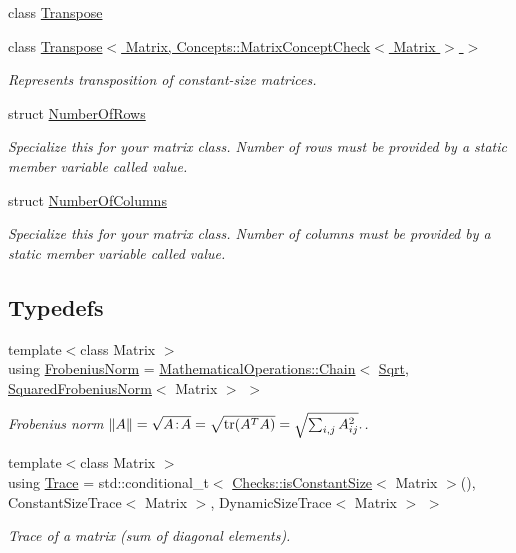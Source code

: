 \begin{DoxyCompactItemize}
class \hyperlink{classfuncy_1_1LinearAlgebra_1_1Transpose}{Transpose}
\item 
class \hyperlink{classfuncy_1_1LinearAlgebra_1_1Transpose_3_01Matrix_00_01Concepts_1_1MatrixConceptCheck_3_01Matrix_01_4_01_4}{Transpose$<$ Matrix, Concepts\-::\-Matrix\-Concept\-Check$<$ Matrix $>$ $>$}
\begin{DoxyCompactList}\small\item\em Represents transposition of constant-\/size matrices. \end{DoxyCompactList}\item 
struct \hyperlink{structfuncy_1_1LinearAlgebra_1_1NumberOfRows}{Number\-Of\-Rows}
\begin{DoxyCompactList}\small\item\em Specialize this for your matrix class. Number of rows must be provided by a static member variable called value. \end{DoxyCompactList}\item 
struct \hyperlink{structfuncy_1_1LinearAlgebra_1_1NumberOfColumns}{Number\-Of\-Columns}
\begin{DoxyCompactList}\small\item\em Specialize this for your matrix class. Number of columns must be provided by a static member variable called value. \end{DoxyCompactList}\end{DoxyCompactItemize}
\subsection*{Typedefs}
\begin{DoxyCompactItemize}
\item 
{\footnotesize template$<$class Matrix $>$ }\\using \hyperlink{group__LinearAlgebraGroup_ga38eae956615afce1e62bbd7c465688b4}{Frobenius\-Norm} = \hyperlink{structfuncy_1_1MathematicalOperations_1_1Chain}{Mathematical\-Operations\-::\-Chain}$<$ \hyperlink{group__CMathGroup_gaa9e33b480a11f18dc15d5da847d88ff5}{Sqrt}, \hyperlink{structfuncy_1_1LinearAlgebra_1_1SquaredFrobeniusNorm}{Squared\-Frobenius\-Norm}$<$ Matrix $>$ $>$
\begin{DoxyCompactList}\small\item\em Frobenius norm $ \|A\| = \sqrt{A\negthinspace : \negthinspace A }= \sqrt{\mathrm{tr}(A^TA)} = \sqrt{\sum_{i,j} A_{ij}^2}. $. \end{DoxyCompactList}\item 
{\footnotesize template$<$class Matrix $>$ }\\using \hyperlink{group__LinearAlgebraGroup_ga5771b42f6ae0c554253a3602f6151b00}{Trace} = std\-::conditional\-\_\-t$<$ \hyperlink{group__ConceptGroup_ga84efea3afd51e9db8be11ee2a5335c98}{Checks\-::is\-Constant\-Size}$<$ Matrix $>$(), Constant\-Size\-Trace$<$ Matrix $>$, Dynamic\-Size\-Trace$<$ Matrix $>$ $>$
\begin{DoxyCompactList}\small\item\em Trace of a matrix (sum of diagonal elements). \end{DoxyCompactList}\end{DoxyCompactItemize}
